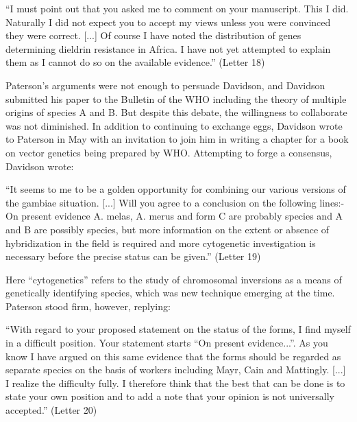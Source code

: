 \documentclass[a4paper,11pt,abstracton,hidelinks]{scrartcl}
\begin{document}
\begin{displayquote}
``I must point out that you asked me to comment on your manuscript. This I did. Naturally I did not expect you to accept my views unless you were convinced they were correct. [...] Of course I have noted the distribution of genes determining dieldrin resistance in Africa. I have not yet attempted to explain them as I cannot do so on the available evidence.'' (Letter 18)
\end{displayquote}


Paterson's arguments were not enough to persuade Davidson, and Davidson submitted his paper to the Bulletin of the WHO including the theory of multiple origins of species A and B. But despite this debate, the willingness to collaborate was not diminished. In addition to continuing to exchange eggs, Davidson wrote to Paterson in May with an invitation to join him in writing a chapter for a book on vector genetics being prepared by WHO. Attempting to forge a consensus, Davidson wrote:


\begin{displayquote}
``It seems to me to be a golden opportunity for combining our various versions of the gambiae situation. [...] Will you agree to a conclusion on the following lines:- On present evidence A. melas, A. merus and form C are probably species and A and B are possibly species, but more information on the extent or absence of hybridization in the field is required and more cytogenetic investigation is necessary before the precise status can be given.'' (Letter 19)
\end{displayquote}


Here ``cytogenetics'' refers to the study of chromosomal inversions as a means of genetically identifying species, which was new technique emerging at the time. Paterson stood firm, however, replying:


\begin{displayquote}
``With regard to your proposed statement on the status of the forms, I find myself in a difficult position. Your statement starts ``On present evidence...''. As you know I have argued on this same evidence that the forms should be regarded as separate species on the basis of workers including Mayr, Cain and Mattingly. [...] I realize the difficulty fully. I therefore think that the best that can be done is to state your own position and to add a note that your opinion is not universally accepted.'' (Letter 20)
\end{displayquote}
\end{document}
